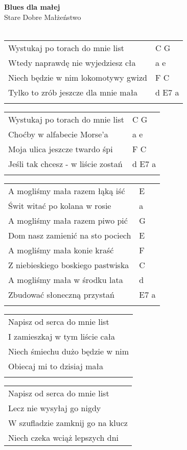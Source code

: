 \documentclass[a5paper]{article}
\begin{document}


\noindent
\fontsize{12pt}{15pt}\selectfont
\textbf{Blues dla małej} \\
\fontsize{8pt}{10pt}\selectfont
Stare Dobre Małżeństwo \\ \\
\fontsize{10pt}{12pt}\selectfont
{}
\begin{tabular}{@{}p{8.5cm}p{3cm}@{}}
\noindent
Wystukaj po torach do mnie list & C G \\
Wtedy naprawdę nie wyjedziesz cła & a e \\
Niech będzie w nim lokomotywy gwizd & F C \\
Tylko to zrób jeszcze dla mnie mała & d E7 a \\ \\
\end{tabular}

\noindent
\begin{tabular}{@{}p{8.5cm}p{3cm}@{}}
Wystukaj po torach do mnie list & C G \\
Choćby w alfabecie Morse'a & a e \\
Moja ulica jeszcze twardo śpi & F C \\
Jeśli tak chcesz - w liście zostań & d E7 a \\ \\
\end{tabular}

\noindent
\begin{tabular}{@{}p{7.5cm}p{3cm}@{}}
A mogliśmy mała razem łąką iść & E \\
Świt witać po kolana w rosie & a \\
A mogliśmy mała razem piwo pić & G \\
Dom nasz zamienić na sto pociech & E \\
A mogliśmy mała konie kraść & F \\
Z niebieskiego boskiego pastwiska & C \\
A mogliśmy mała w środku lata & d \\
Zbudować słoneczną przystań & E7 a \\ \\
\end{tabular}

\noindent
\begin{tabular}{@{}p{9.5cm}@{}}
Napisz od serca do mnie list \\
I zamieszkaj w tym liście cała \\
Niech śmiechu dużo będzie w nim \\
Obiecaj mi to dzisiaj mała \\ \\
\end{tabular}

\noindent
\begin{tabular}{@{}p{9.5cm}@{}}
Napisz od serca do mnie list \\
Lecz nie wysyłaj go nigdy \\
W szufladzie zamknij go na klucz \\
Niech czeka wciąż lepszych dni
\end{tabular}
\end{document}
